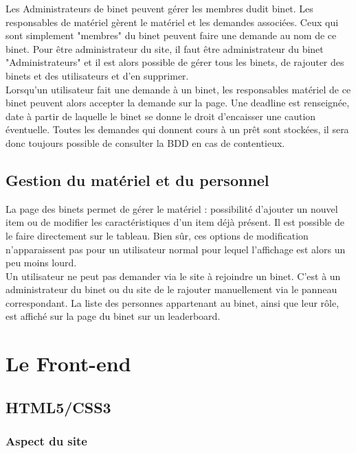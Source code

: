 \documentclass[titlepage,11pt,a4paper]{article}
\begin{document}
Les Administrateurs de binet peuvent gérer les membres dudit binet. Les responsables de matériel gèrent le matériel et les demandes associées. Ceux qui sont simplement "membres" du binet peuvent faire une demande au nom de ce binet. Pour être administrateur du site, il faut être administrateur du binet "Administrateurs" et il est alors possible de gérer tous les binets, de rajouter des binets et des utilisateurs et d'en supprimer.\\

Lorsqu'un utilisateur fait une demande à un binet, les responsables matériel de ce binet peuvent alors accepter la demande sur la page. Une deadline est renseignée, date à partir de laquelle le binet se donne le droit d'encaisser une caution éventuelle. Toutes les demandes qui donnent cours à un prêt sont stockées, il sera donc toujours possible de consulter la BDD en cas de contentieux.

\subsection{Gestion du matériel et du personnel}

La page des binets permet de gérer le matériel : possibilité d'ajouter un nouvel item ou de modifier les caractéristiques d'un item déjà présent. Il est possible de le faire directement sur le tableau. Bien sûr, ces options de modification n'apparaissent pas pour un utilisateur normal pour lequel l'affichage est alors un peu moins lourd.\\

Un utilisateur ne peut pas demander via le site à rejoindre un binet. C'est à un administrateur du binet ou du site de le rajouter manuellement via le panneau correspondant. La liste des personnes appartenant au binet, ainsi que leur rôle, est affiché sur la page du binet sur un leaderboard.

\section{Le Front-end}

\subsection{HTML5/CSS3}

\subsubsection{Aspect du site}
\end{document}

